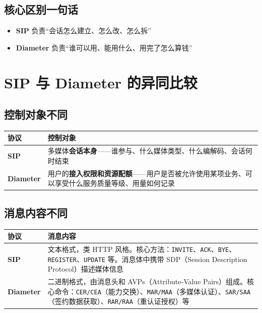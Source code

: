 \documentclass[12pt,a4paper]{ctexart}
\newcommand{\code}[1]{\texttt{#1}}
\begin{document}
\subsection*{核心区别一句话}
\begin{itemize}
  \item \textbf{SIP} 负责“会话怎么建立、怎么改、怎么拆”
  \item \textbf{Diameter} 负责“谁可以用、能用什么、用完了怎么算钱”
\end{itemize}

\section{SIP 与 Diameter 的异同比较}

\subsection{控制对象不同}

\begin{table}[htbp]
\centering
\scriptsize
\begin{tabular}{>{\bfseries}p{2.5cm} p{11.5cm}}
\toprule
\textbf{协议} & \textbf{控制对象} \\
\midrule
SIP &
多媒体\textbf{会话本身}——谁参与、什么媒体类型、什么编解码、会话何时结束 \\
\addlinespace
Diameter &
用户的\textbf{接入权限和资源配额}——用户是否被允许使用某项业务、可以享受什么服务质量等级、用量如何记录 \\
\bottomrule
\end{tabular}
\end{table}

\subsection{消息内容不同}

\begin{table}[htbp]
\centering
\scriptsize
\begin{tabular}{>{\bfseries}p{2.5cm} p{11.5cm}}
\toprule
\textbf{协议} & \textbf{消息内容} \\
\midrule
SIP &
文本格式，类 HTTP 风格。核心方法：\code{INVITE}、\code{ACK}、\code{BYE}、\code{REGISTER}、\code{UPDATE} 等。消息体中携带 SDP（Session Description Protocol）描述媒体信息 \\
\addlinespace
Diameter &
二进制格式，由消息头和 AVPs（Attribute-Value Pairs）组成。核心命令：\code{CER/CEA}（能力交换）、\code{MAR/MAA}（多媒体认证）、\code{SAR/SAA}（签约数据获取）、\code{RAR/RAA}（重认证授权）等 \\
\bottomrule
\end{tabular}
\end{table}
\end{document}
